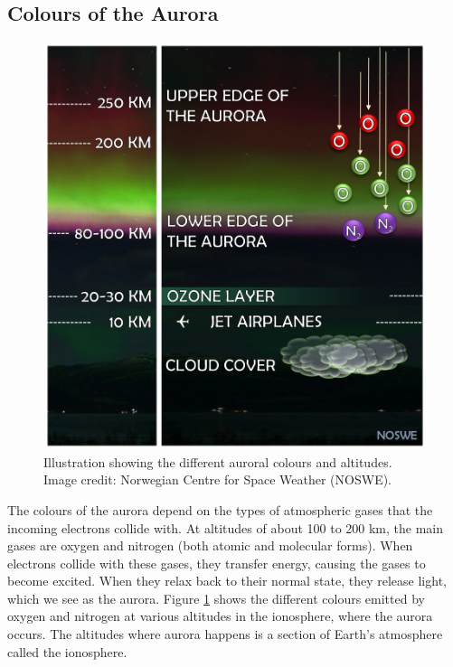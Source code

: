 \documentclass{article}
\begin{document}
\subsection{Colours of the Aurora}


\begin{figure}[h!]
  \includegraphics[width=\linewidth]{Fig3_Colours.png}
  \caption{Illustration showing the different auroral colours and altitudes. Image credit: Norwegian Centre for Space Weather (NOSWE). }
  \label{fig-colours}
  
\end{figure}

The colours of the aurora depend on the types of atmospheric gases that the incoming electrons collide with. At altitudes of about 100 to 200 km, the main gases are oxygen and nitrogen (both atomic and molecular forms). When electrons collide with these gases, they transfer energy, causing the gases to become excited. When they relax back to their normal state, they release light, which we see as the aurora. Figure \ref{fig-colours} shows the different colours emitted by oxygen and nitrogen at various altitudes in the ionosphere, where the aurora occurs. The altitudes where aurora happens is a section of Earth's atmosphere called the ionosphere.
\end{document}
